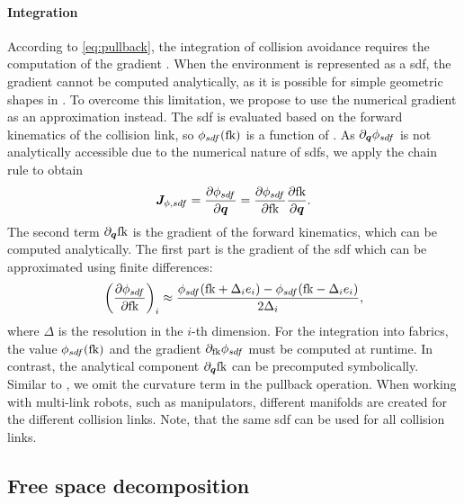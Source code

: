 \paragraph{Integration}
According 
to \cref{eq:pullback}, the integration of collision
avoidance requires the computation of the gradient \J{}.
When the environment is represented as a \ac{sdf}, the gradient cannot be
computed analytically, as it is possible for simple geometric shapes in
\cite{Ratliff2021,Spahn2023}. To overcome this limitation, we propose to
use the numerical gradient as an approximation instead.
The \ac{sdf} is evaluated based on the forward kinematics of the collision link,
so $\phi_{sdf}(\textrm{fk})$ is a function of \q{}.
As $\partial_{\bm{q}}\phi_{sdf}$ is not analytically accessible due to the numerical
nature of \acp{sdf}, we apply the chain rule to obtain
\[
  \bm{J}_{\phi,sdf} = \frac{\partial\phi_{sdf}}{\partial\bm{q}} = \frac{\partial\phi_{sdf}}{\partial\textrm{fk}}\frac{\partial\textrm{fk}}{\partial\bm{q}}.
\]
The second term $\partial_{\bm{q}}\textrm{fk}$ is the gradient of the forward
kinematics, which can be computed analytically. The first part is the gradient
of the \ac{sdf} which can be
approximated using finite differences:
\[
  \left(\frac{\partial\phi_{sdf}}{\partial\textrm{fk}}\right)_i \approx 
  \frac{\phi_{sdf}(\textrm{fk} + \Delta_i e_i) - \phi_{sdf}(\textrm{fk} - \Delta_i e_i)}{2 \Delta_i},
\]
where $\Delta$ is the resolution in the $i$-th dimension.
For the integration into \ac{fabrics}, the
value $\phi_{sdf}(\textrm{fk})$ and the gradient $\partial_{\textrm{fk}}\phi_{sdf}$
must be computed at runtime.
In contrast, the analytical component $\partial_{\bm{q}}\textrm{fk}$ can be
precomputed symbolically. Similar to \cite{Ratliff2021}, we omit the
curvature term \Jdot{} in the pullback operation.
%
When working with multi-link robots, such as manipulators, different manifolds
are created for the different collision links. Note, that
the same \ac{sdf}
can be used for all collision links.

\subsection{Free space decomposition}
\label{sub:Free Space Decomposition}

